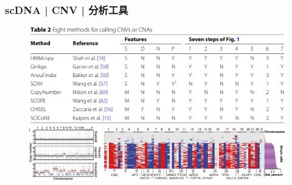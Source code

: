\documentclass[11pt]{ctexbeamer}
\begin{document}
\begin{frame}
  \frametitle{scDNA | CNV | 分析工具}
  \begin{figure}
    \centering
    \includegraphics[width=\textwidth]{scDNA_CNA_tools.png}\\ \vspace{1em}
    \includegraphics[width=0.28\textwidth]{scDNA_CNA_out_01.png}
    \includegraphics[width=0.7\textwidth]{scDNA_CNA_out_02.png}
  \end{figure}
\end{frame}
\end{document}
